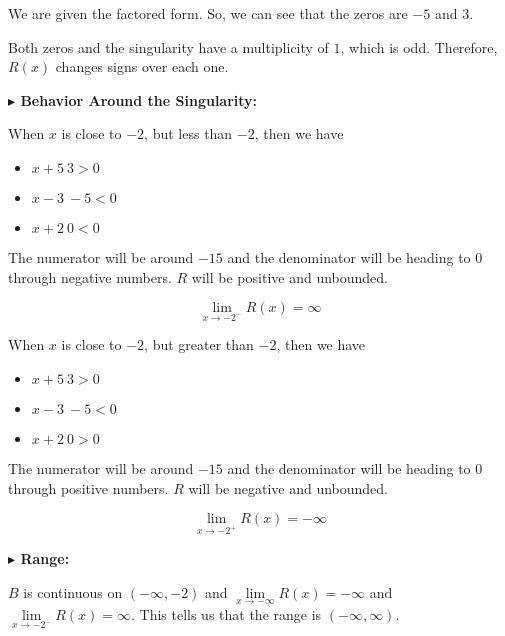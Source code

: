 \documentclass{ximera}
\begin{document}
\begin{exercise}
We are given the factored form.  So, we can see that the zeros are $-5$ and $3$.



Both zeros and the singularity have a multiplicity of $1$, which is odd.  Therefore, $R(x)$ changes signs over each one.




\textbf{\textcolor{blue!55!black}{$\blacktriangleright$ Behavior Around the Singularity: }}  


When $x$ is close to $-2$, but less than $-2$, then we have 


\begin{itemize}
\item $x+5 ~ 3 > 0$
\item $x-3 ~ -5 < 0$
\item $x+2 ~ 0 < 0$
\end{itemize}


The numerator will be around $-15$ and the denominator will be heading to $0$ through negative numbers.  $R$ will be positive and unbounded.




\[
\lim\limits_{x \to -2^-} R(x) = \infty
\]






When $x$ is close to $-2$, but greater than $-2$, then we have 


\begin{itemize}
\item $x+5 ~ 3 > 0$
\item $x-3 ~ -5 < 0$
\item $x+2 ~ 0 > 0$
\end{itemize}


The numerator will be around $-15$ and the denominator will be heading to $0$ through positive numbers.  $R$ will be negative and unbounded.




\[
\lim\limits_{x \to -2^+} R(x) = -\infty
\]





\textbf{\textcolor{blue!55!black}{$\blacktriangleright$ Range: }}


$B$ is continuous on $(-\infty, -2)$ and  $\lim\limits_{x \to -\infty} R(x) = -\infty$  and $\lim\limits_{x \to -2^-} R(x) = \infty$.  This tells us that the range is $(-\infty, \infty)$.








\end{exercise}
\end{document}
